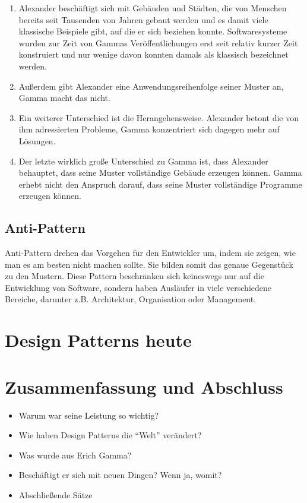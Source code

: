 \documentclass[fontsize=11pt,a4paper,final]{scrreprt}[2003/01/01]
\begin{document}
\begin{enumerate} 
\item Alexander beschäftigt sich mit Gebäuden und Städten, die von Menschen bereits seit Tausenden von Jahren gebaut werden und es damit viele klassische Beispiele gibt, auf die er sich beziehen konnte. Softwaresysteme wurden zur Zeit von Gammas Veröffentlichungen erst seit relativ kurzer Zeit konstruiert und nur wenige davon konnten damals als klassisch bezeichnet werden.
\item Außerdem gibt Alexander eine Anwendungsreihenfolge seiner Muster an, Gamma macht das nicht.
\item Ein weiterer Unterschied ist die Herangehensweise. Alexander betont die von ihm adressierten Probleme, Gamma konzentriert sich dagegen mehr auf Lösungen.
\item Der letzte wirklich große Unterschied zu Gamma ist, dass Alexander behauptet, dass seine Muster vollständige Gebäude erzeugen können. Gamma erhebt nicht den Anspruch darauf, dass seine Muster vollständige Programme erzeugen können.
\end{enumerate}

\section{Anti-Pattern}
Anti-Pattern drehen das Vorgehen für den Entwickler um, indem sie zeigen, wie man es am besten nicht machen sollte. Sie bilden somit das genaue Gegenstück zu den Mustern. Diese Pattern beschränken sich keineswegs nur auf die Entwicklung von Software, sondern haben Ausläufer in viele verschiedene Bereiche, darunter z.B. Architektur, Organisation oder Management. \cite{AntiPatternsCatalog}

\chapter{Design Patterns heute}\label{se:Design Patterns heute}


\chapter{Zusammenfassung und Abschluss}\label{se:Zusammenfassung und Abschluss}
\begin{itemize} 
	\item Warum war seine Leistung so wichtig?
	\item Wie haben Design Patterns die \enquote{Welt} verändert?
	\item Was wurde aus Erich Gamma?
	\item Beschäftigt er sich mit neuen Dingen? Wenn ja, womit?
	\item Abschließende Sätze
\end{itemize}

\newpage

\end{document}
